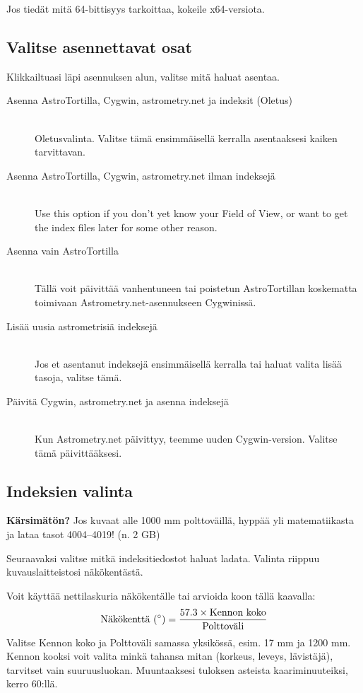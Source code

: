 \documentclass{article}
\begin{document}
Jos tiedät mitä 64-bittisyys tarkoittaa, kokeile x64-versiota.

\subsection{Valitse asennettavat osat}

Klikkailtuasi läpi asennuksen alun, valitse mitä haluat asentaa.

\begin{description}
\item [Asenna AstroTortilla, Cygwin, astrometry.net ja indeksit (Oletus)] \hfill \\
Oletusvalinta. Valitse tämä ensimmäisellä kerralla asentaaksesi kaiken tarvittavan.

\item [Asenna AstroTortilla, Cygwin, astrometry.net ilman indeksejä]\hfill \\
Use this option if you don't yet know your Field of View, or want to get the index files later for some other reason.

\item [Asenna vain AstroTortilla] \hfill \\
Tällä voit päivittää vanhentuneen tai poistetun AstroTortillan koskematta toimivaan Astrometry.net-asennukseen Cygwinissä.

\item [Lisää uusia astrometrisiä indeksejä] \hfill \\
Jos et asentanut indeksejä ensimmäisellä kerralla tai haluat valita lisää tasoja, valitse tämä.

\item [Päivitä Cygwin, astrometry.net ja asenna indeksejä] \hfill \\
Kun Astrometry.net päivittyy, teemme uuden Cygwin-version. Valitse tämä päivittääksesi.
\end{description}


\subsection{Indeksien valinta}

{\scriptsize \textbf{Kärsimätön?} Jos kuvaat alle 1000 mm polttoväillä, hyppää yli matematiikasta ja lataa tasot 4004--4019! (n. 2 GB)}

Seuraavaksi valitse mitkä indeksitiedostot haluat ladata. Valinta riippuu kuvauslaitteistosi näkökentästä.

Voit käyttää nettilaskuria näkökentälle tai arvioida koon tällä kaavalla:
\[
\text{Näkökenttä (\ensuremath{^\circ})}=\frac{57.3\times\text{Kennon koko}}{\text{Polttoväli}}
\]
Valitse Kennon koko ja Polttoväli samassa yksikössä, esim. 17 mm ja 1200 mm. Kennon kooksi voit valita minkä tahansa mitan (korkeus, leveys, lävistäjä), tarvitset vain suuruusluokan. Muuntaaksesi tuloksen asteista kaariminuuteiksi, kerro 60:llä.
\end{document}
